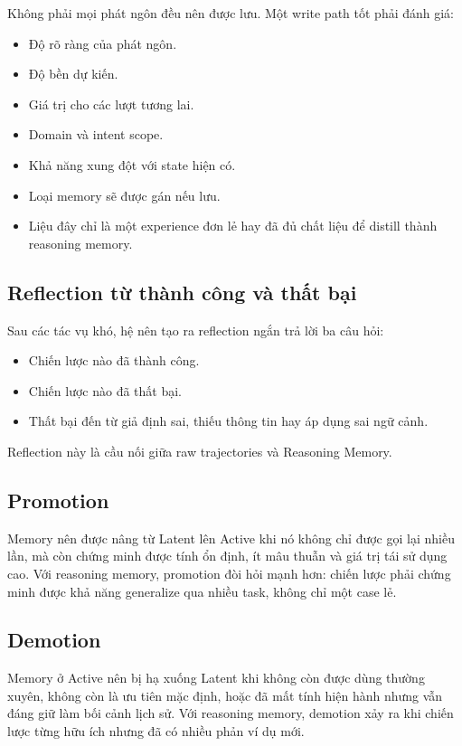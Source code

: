 \documentclass[a4paper,12pt]{article}
\begin{document}
Không phải mọi phát ngôn đều nên được lưu. Một write path tốt phải đánh giá:
\begin{itemize}
    \item Độ rõ ràng của phát ngôn.
    \item Độ bền dự kiến.
    \item Giá trị cho các lượt tương lai.
    \item Domain và intent scope.
    \item Khả năng xung đột với state hiện có.
    \item Loại memory sẽ được gán nếu lưu.
    \item Liệu đây chỉ là một experience đơn lẻ hay đã đủ chất liệu để distill thành reasoning memory.
\end{itemize}

\subsection*{Reflection từ thành công và thất bại}

Sau các tác vụ khó, hệ nên tạo ra reflection ngắn trả lời ba câu hỏi:
\begin{itemize}
    \item Chiến lược nào đã thành công.
    \item Chiến lược nào đã thất bại.
    \item Thất bại đến từ giả định sai, thiếu thông tin hay áp dụng sai ngữ cảnh.
\end{itemize}

Reflection này là cầu nối giữa raw trajectories và Reasoning Memory.

\subsection*{Promotion}

Memory nên được nâng từ Latent lên Active khi nó không chỉ được gọi lại nhiều lần, mà còn chứng minh được tính ổn định, ít mâu thuẫn và giá trị tái sử dụng cao. Với reasoning memory, promotion đòi hỏi mạnh hơn: chiến lược phải chứng minh được khả năng generalize qua nhiều task, không chỉ một case lẻ.

\subsection*{Demotion}

Memory ở Active nên bị hạ xuống Latent khi không còn được dùng thường xuyên, không còn là ưu tiên mặc định, hoặc đã mất tính hiện hành nhưng vẫn đáng giữ làm bối cảnh lịch sử. Với reasoning memory, demotion xảy ra khi chiến lược từng hữu ích nhưng đã có nhiều phản ví dụ mới.
\end{document}
